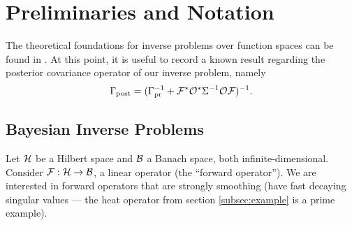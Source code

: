 \documentclass{amsart}
\numberwithin{equation}{section}
\begin{document}

\section{Preliminaries and Notation}\label{section:prelim}

The theoretical foundations for inverse problems over function spaces
can be found in \cite{Stuart10}. At this point, it is useful to
record a known result regarding the posterior covariance operator of
our inverse problem, namely
\begin{align}\label{eq:postcov precursor}
  \Gamma_{\textup{post}} = (\Gamma_{\textup{pr}}^{-1} + \mathcal{F}^* \mathcal{O}^* \Sigma^{-1} \mathcal{O} \mathcal{F} )^{-1}.
\end{align}

\subsection{Bayesian Inverse Problems}\label{section:abstract OED}
Let $\mathcal{H}$ be a Hilbert space and $\mathcal{B}$ a Banach space, both
infinite-dimensional. Consider $\mathcal{F}: \mathcal{H} \to \mathcal{B}$, a linear
operator (the ``forward operator''). We are interested in forward
operators that are strongly smoothing (have fast decaying singular
values --- the heat operator from section \ref{subsec:example} is a
prime example).
\end{document}
